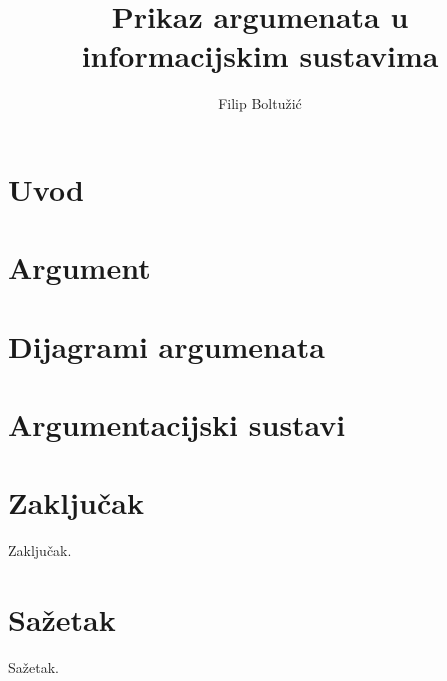 \documentclass[times, utf8, seminar]{fer}
\begin{document}
\title{Prikaz argumenata u informacijskim sustavima}

\author{Filip Boltužić}


\maketitle

\tableofcontents

\chapter{Uvod}


\chapter{Argument}


\chapter{Dijagrami argumenata}


\chapter{Argumentacijski sustavi}


\chapter{Zaključak}
Zaključak.




\chapter{Sažetak}
Sažetak.
\end{document}
